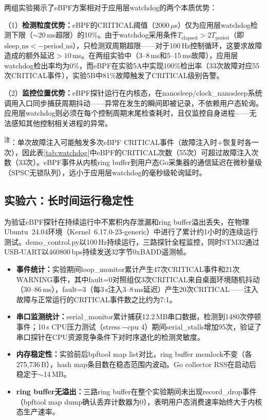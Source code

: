 \documentclass{rjthesis}
\begin{document}
两组实验揭示了eBPF方案相对于应用层watchdog的两个本质优势：

（1）\textbf{检测粒度优势：}eBPF的CRITICAL阈值（2000\,$\mu$s）仅为应用层watchdog检测下限（$\sim$20\,ms超限）的10\%。由于watchdog采用条件$T_{\text{elapsed}} > 2T_{\text{period}}$（即$\text{sleep\_ns} < -\text{period\_ns}$），只检测双周期超限——对于100\,Hz控制循环，这要求故障造成的额外延迟$>10$\,ms。在两组实验中（3--8\,ms和5--15\,ms故障），应用层watchdog检出率均为0\%，而eBPF在实验5A中实现100\%检出率（33次故障对应55次CRITICAL事件），实验5B中81\%故障触发了CRITICAL级别告警。

（2）\textbf{监控位置优势：}eBPF探针运行在内核态，在nanosleep/clock\_nanosleep系统调用入口同步捕获周期抖动——异常在发生的瞬间即被记录，不依赖用户态轮询。应用层watchdog则必须在每个控制周期末尾检查耗时，且仅监控自身进程——无法感知其他控制相关进程的异常。

\textsuperscript{注}：单次故障注入可能触发多次eBPF CRITICAL事件（故障注入时+恢复时各一次），因此表\ref{tab:watchdog}中eBPF的CRITICAL次数（55次）可超过故障注入次数（33次）。eBPF事件从内核ring buffer到用户态Go采集器的通信延迟在微秒量级（SPSC无锁队列），远小于应用层watchdog的毫秒级轮询延时。

\subsection{实验六：长时间运行稳定性}

为验证eBPF探针在持续运行中不累积内存泄漏和ring buffer溢出丢失，在物理Ubuntu~24.04环境（Kernel~6.17.0-23-generic）中进行了累计约1小时的连续运行测试。demo\_control.py以100\,Hz持续运行，三路探针全程监控，同时STM32通过USB-UART以460800\,bps持续发送32字节0xBADD遥测帧。

\begin{itemize}
    \item \textbf{事件统计：}实验期间loop\_monitor累计产生47次CRITICAL事件和21次WARNING事件，其中fault=0对照组仅3次CRITICAL来自桌面环境随机抖动（30--86\,ms），fault=3（每3\,s注入3--8\,ms延迟）产生20次CRITICAL——注入故障与正常运行的CRITICAL事件数之比约为7:1。
    \item \textbf{串口监测统计：}serial\_monitor累计捕获12.2\,MB串口数据，检测到1480次停顿事件；10\,s CPU压力测试（stress -{}-cpu 4）期间serial\_stalls增加95次，验证了串口探针在CPU资源竞争条件下对时序退化的检测灵敏度。
    \item \textbf{内存稳定性：}实验前后bpftool map list对比，ring buffer memlock不变（各275,736\,B），hash map条目数在稳态范围内波动。Go collector RSS在启动后稳定于$\sim$14\,MB。
    \item \textbf{ring buffer无溢出：}三路ring buffer在整个实验期间未出现record\_drop事件（bpftool map dump确认丢弃计数器为0），表明用户态消费速率始终大于内核态生产速率。
\end{itemize}
\end{document}
